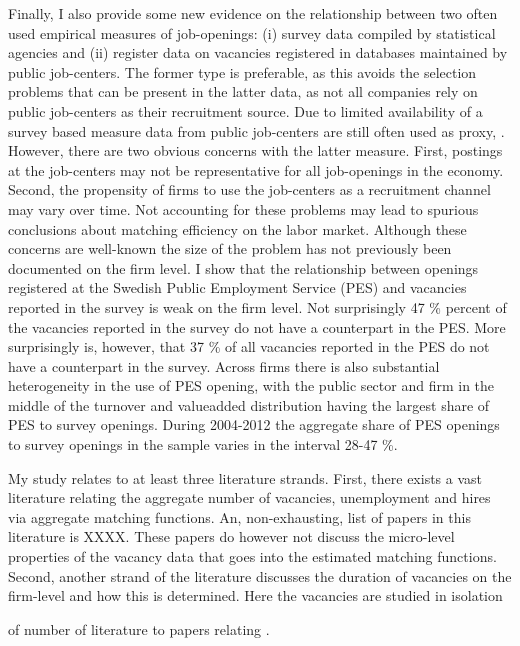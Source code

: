 Finally, I also provide some new evidence on the relationship between two often used empirical measures of job-openings: (i) survey data compiled by statistical agencies and (ii) register data on vacancies registered in databases maintained by public job-centers. The former type is preferable, as this avoids the selection problems that can be present in the latter data, as not all companies rely on public job-centers as their recruitment source. Due to limited availability of a survey based measure data from public job-centers are still often used as proxy, \citep{Berman1997, Carlsson2013, Hansen2004,  Wall2002, Yashiv2000}. However, there are two obvious concerns with the latter measure. First, postings at the job-centers may not be representative for all job-openings in the economy. Second, the propensity of firms to use the job-centers as a recruitment channel may vary over time.  Not accounting for these problems may lead to spurious conclusions about matching efficiency on the labor market. Although these concerns are well-known the size of the problem has not previously been documented on the firm level. I show that the relationship between openings registered at the Swedish Public Employment Service (PES) and vacancies reported in the survey is weak on the firm level. Not surprisingly 47 \% percent of the vacancies reported in the survey do not have a counterpart in the PES. More surprisingly is, however, that 37 \% of all vacancies reported in the PES do not have a counterpart in the survey. Across firms there is also substantial heterogeneity in the use of PES opening, with the public sector and firm in the middle of the turnover and valueadded distribution having the largest share of PES to survey openings. During 2004-2012 the aggregate share of PES openings to survey openings in the sample varies in the interval 28-47 \%.

My study relates to at least three literature strands. First, there exists a vast literature relating the aggregate number of vacancies, unemployment and hires via aggregate matching functions. An, non-exhausting, list of papers in this literature is XXXX. These papers do however not discuss the micro-level properties of the vacancy data that goes into the estimated matching functions. Second, another strand of the literature discusses the duration of vacancies on the firm-level and how this is determined. Here the vacancies are studied in isolation

 of  number of literature to papers relating . 

